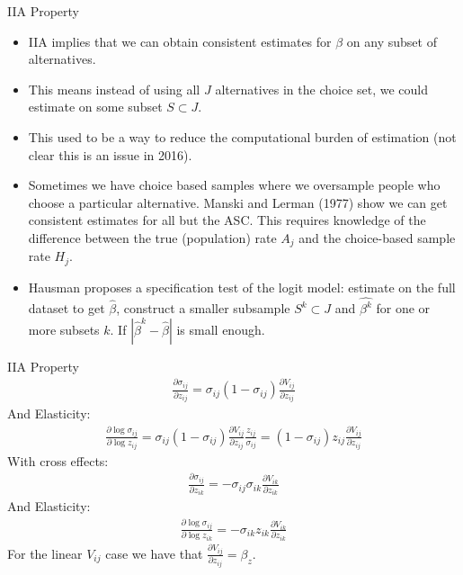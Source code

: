 \documentclass[aspectratio=169,11pt]{beamer}
\begin{document}
\begin{frame}{IIA Property}
\begin{itemize}
\item IIA implies that we can obtain consistent estimates for $\beta$ on any subset of alternatives.
\item This means instead of using all $J$ alternatives in the choice set, we could estimate on some subset $S \subset J$.
\item This used to be a way to reduce the computational burden of estimation (not clear this is an issue in 2016).
\item Sometimes we have \alert{choice based samples} where we oversample people who choose a particular alternative. Manski and Lerman (1977) show we can get consistent estimates for all but the ASC. This requires knowledge of the difference between the true (population) rate $A_j$ and the choice-based sample rate $H_j$.
\item Hausman proposes a specification test of the logit model: estimate on the full dataset to get $\hat{\beta}$, construct a smaller subsample $S^k \subset J$ and $\hat{\beta^k}$ for one or more subsets $k$. If $|\hat{\beta}^k - \hat{\beta}|$ is small enough.
\end{itemize}
\end{frame}

\begin{frame}{IIA Property}
\small
\begin{eqnarray*}
\frac{\partial \sigma_{ij}}{\partial z_{ij}} = \sigma_{ij}(1- \sigma_{ij}) \frac{\partial V_{ij}}{\partial z_{ij}}
\end{eqnarray*}
And Elasticity:
\begin{eqnarray*}
\frac{ \partial \log \sigma_{ij}}{ \partial \log z_{ij}} = \sigma_{ij}(1- \sigma_{ij}) \frac{\partial V_{ij}}{\partial z_{ij}} \frac{z_{ij}}{\sigma_{ij}} = (1- \sigma_{ij}) z_{ij} \frac{\partial V_{ij}}{\partial z_{ij}}
\end{eqnarray*}
With cross effects:
\begin{eqnarray*}
\frac{\partial \sigma_{ij}}{\partial z_{ik}} = -\sigma_{ij} \sigma_{ik} \frac{\partial V_{ik}}{\partial z_{ik}}
\end{eqnarray*}
And Elasticity:
\begin{eqnarray*}
\frac{ \partial \log \sigma_{ij}}{ \partial \log z_{ik}} = -\sigma_{ik} z_{ik} \frac{\partial V_{ik}}{\partial z_{ik}}
\end{eqnarray*}
For the linear $V_{ij}$ case we have that $\frac{\partial V_{ij}}{\partial z_{ij}}=  \beta_z$.
\end{frame}
\end{document}
